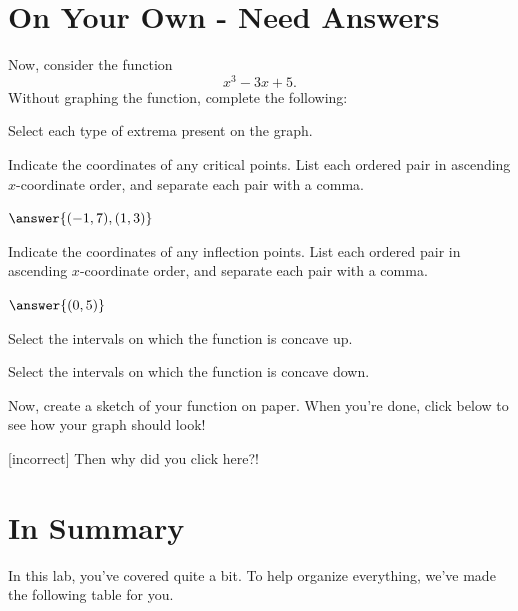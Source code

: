 \documentclass{ximera}
\begin{document}
\section{On Your Own - Need Answers}
\begin{question}
Now, consider the function $$x^3-3x+5\text{.}$$ Without graphing the function, complete the following:

Select each type of extrema present on the graph.
\begin{selectAll}
\end{selectAll}

Indicate the coordinates of any critical points. List each ordered pair in ascending $x$-coordinate order, and separate each pair with a comma.

$\answer{(-1,7),(1,3)}$

Indicate the coordinates of any inflection points. List each ordered pair in ascending $x$-coordinate order, and separate each pair with a comma.

$\answer{(0,5)}$

Select the intervals on which the function is concave up.

\begin{selectAll}
\choice{$[-5,10]$}
\choice{$[1,2]$}
\choice[correct]{$[0,\infty)$}
\choice{$(-\infty, 0]$}
\end{selectAll}

Select the intervals on which the function is concave down.

\begin{selectAll}
\choice{$[0,10]$}
\choice{$[1,2]$}
\choice{$[0,\infty)$}
\choice[correct]{$(-\infty,0]$}
\end{selectAll}

Now, create a sketch of your function on paper. When you're done, click below to see how your graph should look!

\begin{multipleChoice}
\end{multipleChoice}
\begin{feedback}

\end{feedback}[incorrect]
Then why did you click here?!
\end{question}

\section{In Summary}
In this lab, you've covered quite a bit. To help organize everything, we've made the following table for you.
\end{document}
